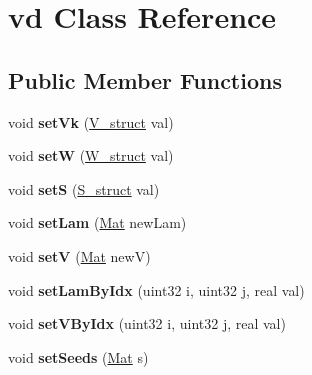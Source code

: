 \hypertarget{classvd}{}\section{vd Class Reference}
\label{classvd}
\subsection*{Public Member Functions}
\begin{DoxyCompactItemize}
\item 
\mbox{\label{classvd_a062d265bd642352d6f7e8cc8685ed7a8}} 
void {\bfseries set\+Vk} (\mbox{\hyperlink{structV__struct}{V\+\_\+struct}} val)
\item 
\mbox{\label{classvd_a85ee3a096c181f76d15f4b7fcf137fe7}} 
void {\bfseries setW} (\mbox{\hyperlink{structW__struct}{W\+\_\+struct}} val)
\item 
\mbox{\label{classvd_a36a19417f43a4316d0172a8ce3476e8e}} 
void {\bfseries setS} (\mbox{\hyperlink{structS__struct}{S\+\_\+struct}} val)
\item 
\mbox{\label{classvd_ae13e9e465d08425218bd8f85ce420c05}} 
void {\bfseries set\+Lam} (\mbox{\hyperlink{aux_8h_aa1fe91b8cd36c618282eb0d548690c4c}{Mat}} new\+Lam)
\item 
\mbox{\label{classvd_a33e792915ebd0295a3475fe686b41ee9}} 
void {\bfseries setV} (\mbox{\hyperlink{aux_8h_aa1fe91b8cd36c618282eb0d548690c4c}{Mat}} newV)
\item 
\mbox{\label{classvd_a8df228a05762e0c0a2bccc28094a1f92}} 
void {\bfseries set\+Lam\+By\+Idx} (uint32 i, uint32 j, real val)
\item 
\mbox{\label{classvd_a29670919bb8d5b2f2f0235ddfda6484e}} 
void {\bfseries set\+V\+By\+Idx} (uint32 i, uint32 j, real val)
\item 
\mbox{\label{classvd_a739318bbb45d4facfcc1899c71b91720}} 
void {\bfseries set\+Seeds} (\mbox{\hyperlink{aux_8h_aa1fe91b8cd36c618282eb0d548690c4c}{Mat}} s)
\item 
\mbox{\label{classvd_a579df0c885a43bb876449889bbcba6cb}} 

\end{DoxyCompactItemize}
